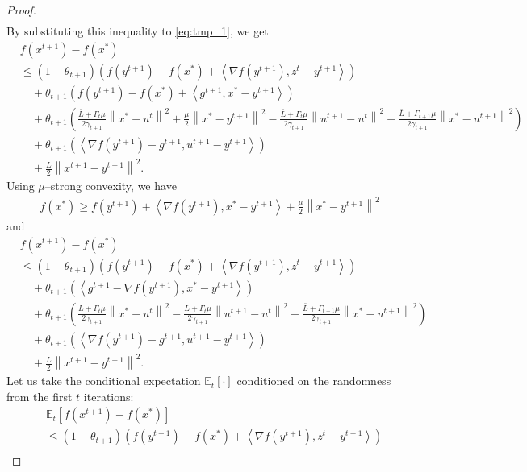 \documentclass{article} %
\newcommand{\norm}[1]{\left\| #1 \right\|}
\newcommand{\inp}[2]{\left\langle#1,#2\right\rangle} %
\newcommand{\ExpSub}[2]{{\mathbb{E}}_{#1}\left[#2\right]}
\theoremstyle{plain}
\theoremstyle{definition}
\theoremstyle{remark}
\begin{document}
\begin{proof}
\begin{align*}
\end{align*}
By substituting this inequality to \eqref{eq:tmp_1}, we get
\begin{align*}
  &f(x^{t+1}) - f(x^*) \\
  &\leq (1 - \theta_{t+1}) \left(f(y^{t+1}) - f(x^*) + \inp{\nabla f(y^{t+1})}{z^t - y^{t+1}}\right) \\
  &\quad+ \theta_{t+1} \left(f(y^{t+1}) - f(x^*) + \inp{g^{t+1}}{x^* - y^{t+1}}\right) \\
  &\quad+ \theta_{t+1} \left(\frac{\bar{L} + \Gamma_{t} \mu}{2 \gamma_{t+1}} \norm{x^* - u^t}^2 + \frac{\mu}{2} \norm{x^* - y^{t+1}}^2 - \frac{\bar{L} + \Gamma_{t} \mu}{2 \gamma_{t+1}} \norm{u^{t+1} - u^t}^2 - \frac{\bar{L} + \Gamma_{t+1} \mu}{2 \gamma_{t+1}} \norm{x^* - u^{t+1}}^2\right) \\
  &\quad+ \theta_{t+1} \left(\inp{\nabla f(y^{t+1}) - g^{t+1}}{u^{t+1} - y^{t+1}}\right) \\
  &\quad+ \frac{L}{2} \norm{x^{t+1} - y^{t+1}}^2.
\end{align*}
Using $\mu$--strong convexity, we have
\begin{align*}
  f(x^*) \geq f(y^{t+1}) + \inp{\nabla f(y^{t+1})}{x^* - y^{t+1}} + \frac{\mu}{2} \norm{x^* - y^{t+1}}^2
\end{align*}
and
\begin{align*}
  &f(x^{t+1}) - f(x^*) \\
  &\leq (1 - \theta_{t+1}) \left(f(y^{t+1}) - f(x^*) + \inp{\nabla f(y^{t+1})}{z^t - y^{t+1}}\right) \\
  &\quad+ \theta_{t+1} \left(\inp{g^{t+1} - \nabla f(y^{t+1})}{x^* - y^{t+1}}\right) \\
  &\quad+ \theta_{t+1} \left(\frac{\bar{L} + \Gamma_{t} \mu}{2 \gamma_{t+1}} \norm{x^* - u^t}^2 - \frac{\bar{L} + \Gamma_{t} \mu}{2 \gamma_{t+1}} \norm{u^{t+1} - u^t}^2 - \frac{\bar{L} + \Gamma_{t+1} \mu}{2 \gamma_{t+1}} \norm{x^* - u^{t+1}}^2\right) \\
  &\quad+ \theta_{t+1} \left(\inp{\nabla f(y^{t+1}) - g^{t+1}}{u^{t+1} - y^{t+1}}\right) \\
  &\quad+ \frac{L}{2} \norm{x^{t+1} - y^{t+1}}^2.
\end{align*}
Let us take the conditional expectation $\ExpSub{t}{\cdot}$ conditioned on the randomness from the first $t$ iterations:
\begin{equation}
\begin{aligned}
  &\ExpSub{t}{f(x^{t+1}) - f(x^*)} \\
  &\leq (1 - \theta_{t+1}) \left(f(y^{t+1}) - f(x^*) + \inp{\nabla f(y^{t+1})}{z^t - y^{t+1}}\right) \\

\end{aligned}
\end{equation}
\end{proof}
\end{document}
